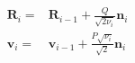 \documentclass{article}
\renewcommand{\vec}[1]{\ensuremath{\mathbf{#1}}}
\begin{document}
\begin{align}
  \vec{R}_i=&\vec{R}_{i-1} + \frac{Q}{\sqrt{2\nu_i}}\vec{n}_i\nonumber\\
  \vec{v}_i=&\vec{v}_{i-1} + \frac{P\sqrt{\nu_i}}{\sqrt{2}}\vec{n}_i\nonumber\\
\nonumber\end{align}
\end{document}
